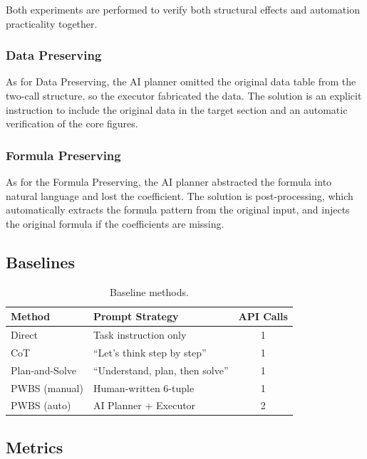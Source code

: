 \documentclass[11pt,a4paper]{article}
\begin{document}
Both experiments are performed to verify both structural effects and automation practicality together.

\subsubsection{Data Preserving}

As for Data Preserving, the AI planner omitted the original data table from the two-call structure, so the executor fabricated the data. The solution is an explicit instruction to include the original data in the target section and an automatic verification of the core figures.

\subsubsection{Formula Preserving}

As for the Formula Preserving, the AI planner abstracted the formula into natural language and lost the coefficient. The solution is post-processing, which automatically extracts the formula pattern from the original input, and injects the original formula if the coefficients are missing.

\subsection{Baselines}

\begin{table}[h]
\centering
\caption{Baseline methods.}
\label{tab:baselines}
\begin{tabular}{llc}
\toprule
\textbf{Method} & \textbf{Prompt Strategy} & \textbf{API Calls} \\
\midrule
Direct & Task instruction only & 1 \\
CoT & ``Let's think step by step'' & 1 \\
Plan-and-Solve & ``Understand, plan, then solve'' & 1 \\
PWBS (manual) & Human-written 6-tuple & 1 \\
PWBS (auto) & AI Planner + Executor & 2 \\
\bottomrule
\end{tabular}
\end{table}

\subsection{Metrics}
\end{document}

